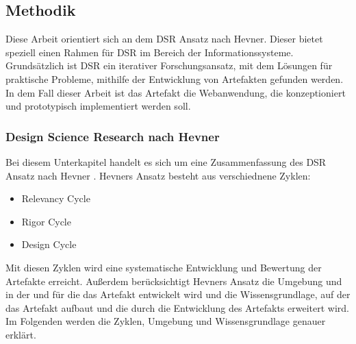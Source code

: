\subsection{Methodik}
Diese Arbeit orientiert sich an dem \ac{DSR} Ansatz nach Hevner. Dieser bietet speziell einen Rahmen für \ac{DSR} im Bereich der Informationssysteme. Grundsätzlich ist \ac{DSR} ein iterativer Forschungsansatz, mit dem Lösungen für praktische Probleme, mithilfe der Entwicklung von Artefakten gefunden werden. In dem Fall dieser Arbeit ist das Artefakt die Webanwendung, die konzeptioniert und prototypisch implementiert werden soll. 

\subsubsection{Design Science Research nach Hevner}
Bei diesem Unterkapitel handelt es sich um eine Zusammenfassung des \ac{DSR} Ansatz nach Hevner \cite[S.~79-81]{Hevner2004}. Hevners Ansatz besteht aus verschiednene Zyklen:

\begin{itemize}
    \item Relevancy Cycle
    \item Rigor Cycle 
    \item Design Cycle
\end{itemize}

Mit diesen Zyklen wird eine systematische Entwicklung und Bewertung der Artefakte erreicht. Außerdem berücksichtigt Hevners Ansatz die Umgebung und  in der und für die das Artefakt entwickelt wird und die Wissensgrundlage, auf der das Artefakt aufbaut und die durch die Entwicklung des Artefakts erweitert wird. Im Folgenden werden die Zyklen, Umgebung und Wissensgrundlage genauer erklärt.

